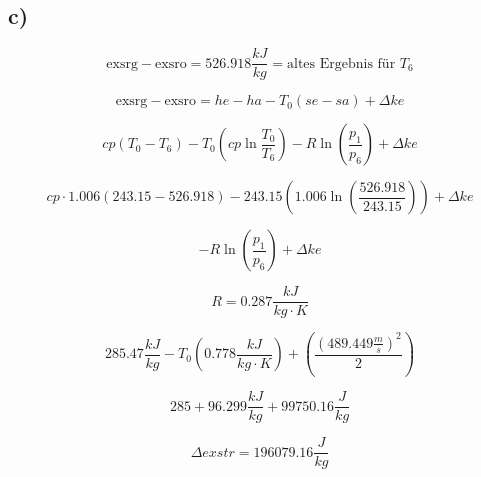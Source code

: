 

\subsection*{c)}

\[
\text{exsrg} - \text{exsro} = 526.918 \frac{kJ}{kg} = \text{altes Ergebnis für } T_6
\]

\[
\text{exsrg} - \text{exsro} = he - ha - T_0 (se - sa) + \Delta ke
\]

\[
cp (T_0 - T_6) - T_0 (cp \ln \frac{T_0}{T_6}) - R \ln (\frac{p_1}{p_6}) + \Delta ke
\]

\[
cp \cdot 1.006 \left( 243.15 - 526.918 \right) - 243.15 \left( 1.006 \ln \left( \frac{526.918}{243.15} \right) \right) + \Delta ke
\]

\[
- R \ln \left( \frac{p_1}{p_6} \right) + \Delta ke
\]

\[
R = 0.287 \frac{kJ}{kg \cdot K}
\]

\[
285.47 \frac{kJ}{kg} - T_0 \left( 0.778 \frac{kJ}{kg \cdot K} \right) + \left( \frac{(489.449 \frac{m}{s})^2}{2} \right)
\]

\[
285 + 96.299 \frac{kJ}{kg} + 99750.16 \frac{J}{kg}
\]

\[
\Delta exstr = 196079.16 \frac{J}{kg}
\]